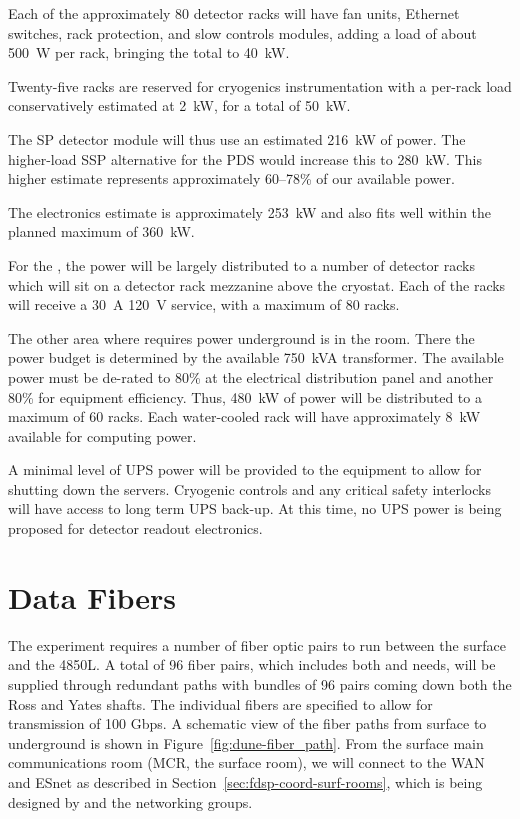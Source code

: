 Each of the approximately 80 detector racks will have fan units,
Ethernet switches, rack protection, and slow controls modules, adding
a load of about 500~W per rack, bringing the total to 40~kW.

Twenty-five racks are reserved for cryogenics instrumentation with a
per-rack load conservatively estimated at 2~kW, for a total of 50~kW.

The SP detector module will thus use an estimated 216~kW of power. The
higher-load SSP alternative for the PDS would increase this to
280~kW. This higher estimate represents approximately 60--78\% of
our available power.

The  electronics estimate is
approximately 253~kW and also fits well within the planned maximum of
360~kW.

For the , the power will be largely distributed to a number
of detector racks which will sit on a detector rack mezzanine above
the cryostat.  Each of the racks will receive a \SI{30}{A} \SI{120}{V} 
service, with a maximum of 80 racks.

The other area where  requires power underground is in the 
room.  There the power budget is determined by the available 750~kVA
transformer.  The available power must be de-rated to 80\% at
the electrical distribution panel and another 80\% for equipment
efficiency.  Thus, 480~kW of power will be distributed to a maximum of
60 racks.  Each water-cooled rack will have approximately 8~kW
available for computing power.

A minimal level of UPS power will be provided to the  equipment to
allow for shutting down the servers.  Cryogenic controls and any
critical safety interlocks will have access to long term UPS back-up.
At this time, no UPS power is being proposed for detector readout
electronics.


\section{Data Fibers}
\label{sec:fdsp-coord-faci-fibers}


The  experiment requires a number of fiber optic pairs to
run between the surface and the 4850L.  A total of 96 fiber
pairs, which includes both  and  needs, will
be supplied through redundant paths with bundles of 96 pairs coming
down both the Ross and Yates shafts.  The individual fibers are
specified to allow for transmission of 100 Gbps.  A schematic view of
the fiber paths from surface to underground is shown in
Figure~\ref{fig:dune-fiber_path}. From the surface main communications room (MCR, the surface 
room), we will connect to the WAN and ESnet as described in
Section~\ref{sec:fdsp-coord-surf-rooms}, which is being designed by
 and the  networking groups.

